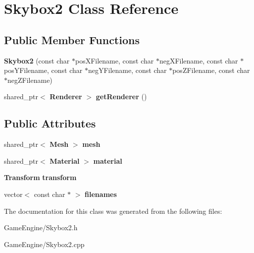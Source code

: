 \section{Skybox2 Class Reference}
\label{class_skybox2}
\subsection*{Public Member Functions}
\begin{DoxyCompactItemize}
\item 
\mbox{\label{class_skybox2_ace061a929a12e0dc44a54f077d56b458}} 
{\bfseries Skybox2} (const char $\ast$pos\+X\+Filename, const char $\ast$neg\+X\+Filename, const char $\ast$pos\+Y\+Filename, const char $\ast$neg\+Y\+Filename, const char $\ast$pos\+Z\+Filename, const char $\ast$neg\+Z\+Filename)
\item 
\mbox{\label{class_skybox2_a3a868703574c1413a92099dcc5b1f63a}} 
shared\+\_\+ptr$<$ \textbf{ Renderer} $>$ {\bfseries get\+Renderer} ()
\end{DoxyCompactItemize}
\subsection*{Public Attributes}
\begin{DoxyCompactItemize}
\item 
\mbox{\label{class_skybox2_ad4e52e935896791c08952c397ffd2629}} 
shared\+\_\+ptr$<$ \textbf{ Mesh} $>$ {\bfseries mesh}
\item 
\mbox{\label{class_skybox2_a38522072e6a3791690e2d772ffd797d7}} 
shared\+\_\+ptr$<$ \textbf{ Material} $>$ {\bfseries material}
\item 
\mbox{\label{class_skybox2_a81f41cd9c0f0330dbb6b476dfbdc9b9c}} 
\textbf{ Transform} {\bfseries transform}
\item 
\mbox{\label{class_skybox2_aa9303aae03f9586f5cac39f119f77f7a}} 
vector$<$ const char $\ast$ $>$ {\bfseries filenames}
\end{DoxyCompactItemize}


The documentation for this class was generated from the following files\+:\begin{DoxyCompactItemize}
\item 
Game\+Engine/Skybox2.\+h\item 
Game\+Engine/Skybox2.\+cpp\end{DoxyCompactItemize}
